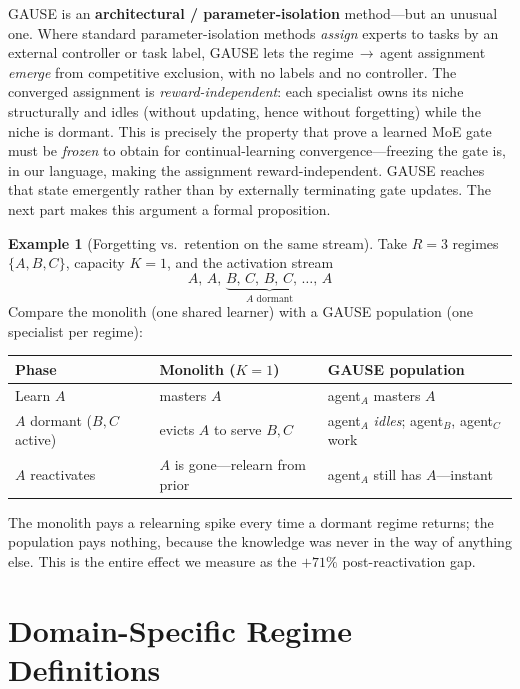 \documentclass[11pt,a4paper]{article}
\theoremstyle{definition}
\newtheorem{example}{Example}[section]
\theoremstyle{plain}
\begin{document}
\begin{keypoint}
GAUSE is an \textbf{architectural / parameter-isolation} method---but an unusual
one. Where standard parameter-isolation methods \emph{assign} experts to tasks by
an external controller or task label, GAUSE lets the regime\,$\to$\,agent
assignment \emph{emerge} from competitive exclusion, with no labels and no
controller. The converged assignment is \emph{reward-independent}: each specialist
owns its niche structurally and idles (without updating, hence without forgetting)
while the niche is dormant. This is precisely the property that
\cite{li2024moecl} prove a learned MoE gate must be \emph{frozen} to obtain for
continual-learning convergence---freezing the gate is, in our language, making the
assignment reward-independent. GAUSE reaches that state emergently rather than by
externally terminating gate updates. The next part makes this argument a formal
proposition.
\end{keypoint}

\begin{example}[Forgetting vs.\ retention on the same stream]
Take $R = 3$ regimes $\{A,B,C\}$, capacity $K = 1$, and the activation stream
\[
A,\,A,\,\underbrace{B,\,C,\,B,\,C,\,\ldots}_{A \text{ dormant}},\,A
\]
Compare the monolith (one shared learner) with a GAUSE population (one specialist
per regime):
\begin{center}
\begin{tabular}{lll}
\toprule
Phase & Monolith ($K{=}1$) & GAUSE population \\
\midrule
Learn $A$ & masters $A$ & agent$_A$ masters $A$ \\
$A$ dormant ($B,C$ active) & evicts $A$ to serve $B,C$ & agent$_A$ \emph{idles}; agent$_B$, agent$_C$ work \\
$A$ reactivates & $A$ is gone---relearn from prior & agent$_A$ still has $A$---instant \\
\bottomrule
\end{tabular}
\end{center}
The monolith pays a relearning spike every time a dormant regime returns; the
population pays nothing, because the knowledge was never in the way of anything
else. This is the entire effect we measure as the $+71\%$ post-reactivation gap.
\end{example}

\section{Domain-Specific Regime Definitions}
\end{document}
